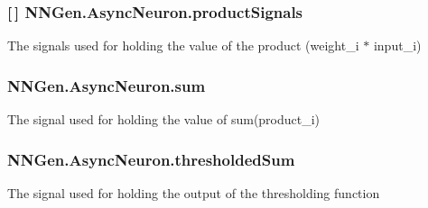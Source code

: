 \hypertarget{class_n_n_gen_1_1_async_neuron_a73d47ce9be628ff13a518e071f695096}{}
\subsubsection[{product\+Signals}]{ \mbox{[}$\,$\mbox{]} N\+N\+Gen.\+Async\+Neuron.\+product\+Signals\hspace{0.3cm}{\ttfamily [get]}}\label{class_n_n_gen_1_1_async_neuron_a73d47ce9be628ff13a518e071f695096}


The signals used for holding the value of the product (weight\+\_\+i $\ast$ input\+\_\+i) 

\hypertarget{class_n_n_gen_1_1_async_neuron_abcb9157df57ac1f3751b2e730703bd58}{}
\subsubsection[{sum}]{ N\+N\+Gen.\+Async\+Neuron.\+sum\hspace{0.3cm}{\ttfamily [get]}}\label{class_n_n_gen_1_1_async_neuron_abcb9157df57ac1f3751b2e730703bd58}


The signal used for holding the value of sum(product\+\_\+i) 

\hypertarget{class_n_n_gen_1_1_async_neuron_a1e0f902ec842b3b970e18c4d02401c4e}{}
\subsubsection[{thresholded\+Sum}]{ N\+N\+Gen.\+Async\+Neuron.\+thresholded\+Sum\hspace{0.3cm}{\ttfamily [get]}}\label{class_n_n_gen_1_1_async_neuron_a1e0f902ec842b3b970e18c4d02401c4e}


The signal used for holding the output of the thresholding function 

\hypertarget{class_n_n_gen_1_1_async_neuron_aeeb431fe55c9cda6e2889691c27c344c}{}
